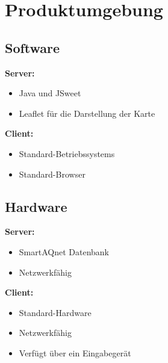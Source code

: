 \section{Produktumgebung}
\subsection{Software}
\textbf{Server:}
\begin{itemize} [noitemsep]
    \item Java und JSweet
    \item Leaflet für die Darstellung der Karte
\end{itemize}
\textbf{ Client:}
\begin{itemize} [noitemsep]
    \item \glspl{Standard-Betriebssystem}
    \item \gls{Standard-Browser}
\end{itemize}
\subsection{Hardware}
\textbf{Server:}
\begin{itemize} [noitemsep]
    \item \gls{SmartAQnet} Datenbank
    \item Netzwerkfähig 
\end{itemize}
\textbf{Client:}
\begin{itemize} [noitemsep]
    \item \gls{Standard-Hardware}
    \item Netzwerkfähig 
    \item Verfügt über ein Eingabegerät
\end{itemize}